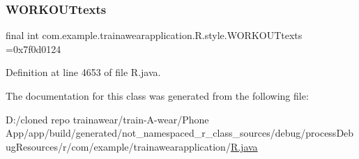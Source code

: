 \subsubsection{\texorpdfstring{WORKOUTtexts}{WORKOUTtexts}}
{\footnotesize\ttfamily final int com.\+example.\+trainawearapplication.\+R.\+style.\+W\+O\+R\+K\+O\+U\+Ttexts =0x7f0d0124\hspace{0.3cm}{\ttfamily [static]}}



Definition at line 4653 of file R.\+java.



The documentation for this class was generated from the following file\+:\begin{DoxyCompactItemize}
\item 
D\+:/cloned repo trainawear/train-\/\+A-\/wear/\+Phone App/app/build/generated/not\+\_\+namespaced\+\_\+r\+\_\+class\+\_\+sources/debug/process\+Debug\+Resources/r/com/example/trainawearapplication/\mbox{\hyperlink{process_debug_resources_2r_2com_2example_2trainawearapplication_2_r_8java}{R.\+java}}\end{DoxyCompactItemize}
